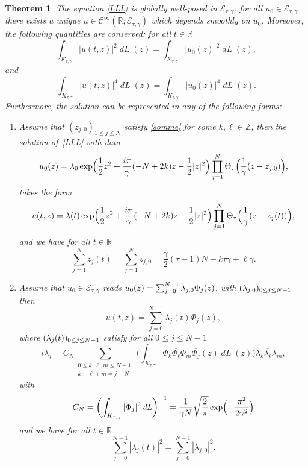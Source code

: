 \documentclass[10pt]{amsart}
\DeclareMathOperator{\dL}{\mathit{dL}}
\newtheorem{theorem}{Theorem}[section]
\theoremstyle{definition}
\let\EE\exp
\let\dis\relax
\let\ov\overline
\newcommand\R{\mathbb R}
\newcommand\Z{\mathbb Z}
\begin{document}
\begin{theorem}\label{prop42}
The equation \eqref{LLL} is globally well-posed in $ \mathcal{E}_{\tau,\gamma}$: for all $u_0 \in \mathcal{E}_{\tau,\gamma}$ there exists a unique $u \in \mathcal{C}^{\infty}(\R ; \mathcal{E}_{\tau,\gamma})$ which depends smoothly on $u_0$. Moreover, the following quantities are conserved: for all $t\in \R$
\begin{equation*}
\int_{K_{\tau,\gamma}}|u(t,z)|^{2}\dL(z)= \int_{K_{\tau,\gamma}}|u_0(z)|^{2}\dL(z),
\end{equation*}
and
\begin{equation*}
\int_{K_{\tau,\gamma}}|u(t,z)|^{4}\dL(z)=\int_{K_{\tau,\gamma}}|u_0(z)|^{4}\dL(z).
\end{equation*}
Furthermore, the solution can be represented in any of the following forms:
\begin{enumerate}
\item Assume that $(z_{j,0})_{1\leq j\leq N}$ satisfy \eqref{somme} for some $k, \ell \in \Z$, then the solution of~\eqref{LLL} with data
\[
u_0(z) = \lambda_0 \EE\Bigl(\frac12 z^2 +\frac{i\pi } {\gamma} (-N+2 k) z - \frac12 |z|^2\Bigr) \prod_{j=1}^N\Theta_{\tau}\Bigl(\frac{1}{\gamma}(z-z_{j,0})\Bigr),
\]
takes the form
\[
u(t,z) = \lambda(t) \EE\Bigl(\frac12 z^2 +\frac{i\pi } {\gamma} (-N+2 k) z - \frac12 |z|^2\Bigr)\prod_{j=1}^N\Theta_{\tau}\Bigl(\frac{1}{\gamma}(z-z_{j}(t))\Bigr),
\]
and we have for all $t \in \R$
\begin{equation}\label{somme1}
\sum_{j=1}^Nz_j(t)=\sum_{j=1}^Nz_{j,0} = \frac{\gamma}{2} (\tau - 1) N - k \tau \gamma + \ell \gamma.
\end{equation}
\item Assume that $u_0 \in \mathcal{E}_{\tau,\gamma}$ reads $\dis u_0(z) =\sum_{j=0}^{N-1} \lambda_{j,0} \Phi_j(z)$, with $\dis (\lambda_{j,0})_{0 \leq j \leq N-1}$ then
\[
u(t,z) =\sum_{j=0}^{N-1} \lambda_j(t) \Phi_j(z),
\]
where $\dis (\lambda_{j}(t))_{0 \leq j \leq N-1}$ satisfy for all $0\leq j\leq N-1$
\begin{equation}\label{systL}
i\dot{\lambda}_j=C_N\sum_{\substack {0\leq k, \ell, m\leq N-1\\ k-\ell+m=j\;\;[N]}}\biggl(\int_{K_{\tau,\gamma}} \Phi_{k}\ov{\Phi_{\ell}} \Phi_{m}\ov{\Phi_{j}}(z)\dL(z)\biggr) \lambda_{k}\ov{\lambda_{\ell}}\lambda_{m},
\end{equation}
with
\[
\dis C_N= \biggl(\int_{K_{\tau, \gamma}}|\Phi_{j}|^{2}\dL \biggr)^{-1}=\frac1{\gamma N} \sqrt{\frac{2}{ {\pi}}} \EE\Bigl(- \frac{\pi^2}{2\gamma^2}\Bigr)
\]
and we have for all $t \in \R$
\begin{equation*}
\sum_{j=0}^{N-1}|\lambda_j(t)|^2= \sum_{j=0}^{N-1}|\lambda_{j,0}|^2.
\end{equation*}
\end{enumerate}
\end{theorem}
\end{document}
